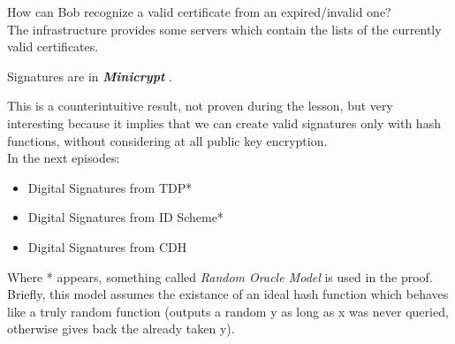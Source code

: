\begin{figure}[h!]
   \centering
   \sdinit{}
\end{figure}

How can Bob recognize a valid certificate from an expired/invalid one?\\

The infrastructure provides some servers which contain the lists of the
currently valid certificates.\\

\begin{theorem}
    Signatures are in \textit{ \textbf{Minicrypt} } .
\end{theorem}
This is a counterintuitive result, not proven during the lesson, but very
interesting because it implies that we can create valid signatures only with hash
functions, without considering at all public key encryption.\\


In the next episodes:
\begin{itemize}
    \item Digital Signatures from TDP*
    \item Digital Signatures from ID Scheme*
    \item Digital Signatures from CDH
\end{itemize}

Where * appears, something called \textit{Random Oracle Model} is used in the
proof. Briefly, this model assumes the existance of an ideal hash function which
behaves like a truly random function (outputs a random y as long as x was never
queried, otherwise gives back the already taken y).
